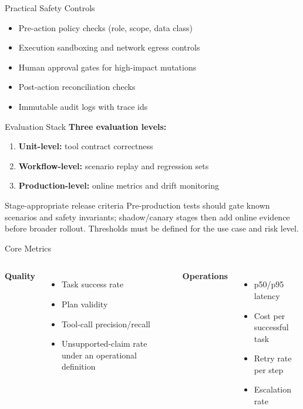 \documentclass[aspectratio=169]{beamer}
\begin{document}
\begin{frame}{Practical Safety Controls}
  \begin{itemize}
    \item Pre-action policy checks (role, scope, data class)
    \item Execution sandboxing and network egress controls
    \item Human approval gates for high-impact mutations
    \item Post-action reconciliation checks
    \item Immutable audit logs with trace ids
  \end{itemize}
\end{frame}

\begin{frame}{Evaluation Stack}
  \textbf{Three evaluation levels:}
  \begin{enumerate}
    \item \textbf{Unit-level:} tool contract correctness
    \item \textbf{Workflow-level:} scenario replay and regression sets
    \item \textbf{Production-level:} online metrics and drift monitoring
  \end{enumerate}

  \vspace{0.4em}
  \begin{block}{Stage-appropriate release criteria}
    Pre-production tests should gate known scenarios and safety invariants; shadow/canary stages then add online evidence before broader rollout. Thresholds must be defined for the use case and risk level.
  \end{block}
\end{frame}

\begin{frame}{Core Metrics}
  \begin{columns}
    \textbf{Quality}
    \begin{itemize}
      \item Task success rate
      \item Plan validity
      \item Tool-call precision/recall
      \item Unsupported-claim rate under an operational definition
    \end{itemize}

    \textbf{Operations}
    \begin{itemize}
      \item p50/p95 latency
      \item Cost per successful task
      \item Retry rate per step
      \item Escalation rate
    \end{itemize}
  \end{columns}
\end{frame}
\end{document}
